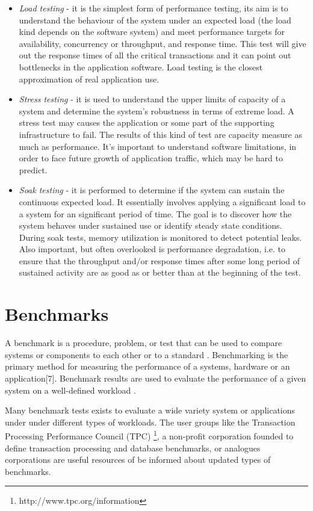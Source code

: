 \begin{itemize}
\item \textit{Load testing} - it is the simplest form of performance testing, its aim is to understand the behaviour of the system under an expected load (the load kind depends on the software system) and meet performance targets for availability, concurrency or throughput, and response time. This test will give out the response times of all the critical transactions and it can point out bottlenecks in the application software. Load testing is the closest approximation of real application use.

\item \textit{Stress testing} -  it is used to understand the upper limits of capacity of a system and determine the system's robustness in terms of extreme load. A stress test may causes the application or some part of the supporting infrastructure to fail. The results of this kind of test are  capacity measure as much as performance. It's important to understand software limitations, in order to face future growth of application traffic, which may be hard to predict.

\item \textit{ Soak testing} - it is performed to determine if the system can sustain the continuous expected load. It essentially involves applying a significant load to a system for an significant period of time. The goal is to discover how the system behaves under sustained use or identify steady state conditions. During soak tests, memory utilization is monitored to detect potential leaks. Also important, but often overlooked is performance degradation, i.e. to ensure that the throughput and/or response times after some long period of sustained activity are as good as or better than at the beginning of the test. 
\end{itemize} 

\section{Benchmarks}
A benchmark is a procedure, problem, or test that can be used to compare systems or components to each other or to a standard \cite{IEEEStd610.12-1990:glossary}. Benchmarking is the primary method for measuring the performance of a systems, hardware or an application[7]. Benchmark results are used to evaluate the performance of a given system on a well-defined workload \cite{Menasce:2001:CPW:560806}.

Many benchmark tests exists to evaluate a wide variety system or applications under under different types of workloads. The user groups like the Transaction Processing Performance Council (TPC) \footnote{http://www.tpc.org/information},  a non-profit corporation founded to define transaction processing and database benchmarks, or analogues corporations are useful resources of be informed about updated types of benchmarks. 

